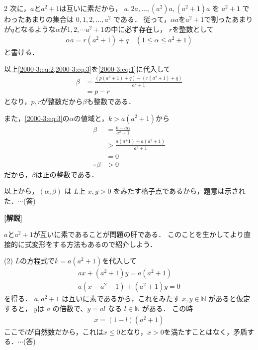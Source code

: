 \documentclass[../../../../main.tex]{subfiles}
\begin{document}
\begin{multicols}{2}
  次に，$a$と$a^2+1$は互いに素だから，
  $a, 2a, \dots, (a^2)a, (a^2+1)a$ を $a^2+1$ でわったあまりの集合は $0, 1, 2, \dots, a^2$ である．
  従って，$\alpha a$を$a^2+1$で割ったあまりが$q$となるような$\alpha$が$1,2,\cdots a^2+1$の中に必ず存在し，
  $r$を整数として
  \begin{align}
    \alpha a = r(a^2+1) + q \quad (1 \le \alpha \le a^2+1) \label{2000-3:eq:3}
  \end{align}
  と書ける．

  以上\cref{2000-3:eq:2,2000-3:eq:3}を\cref{2000-3:eq:1}に代入して
  \begin{align*}
    \beta
     & = \frac{(p(a^2+1) + q) - (r(a^2+1)+q)}{a^2+1} \\
     & = p - r
  \end{align*}
  となり，$p,r$が整数だから$\beta$も整数である．

  また，\cref{2000-3:eq:3}の$\alpha$の値域と，$k>a(a^2+1)$から
  \begin{align*}
    \beta
          & = \frac{k-a\alpha}{a^2+1}        \\
          & > \frac{a(a^+1)-a(a^2+1)}{a^2+1} \\
          & = 0                              \\
    \therefore
    \beta & > 0
  \end{align*}
  だから，$\beta$は正の整数である．

  以上から，$(\alpha, \beta)$ は $L$上 $x, y > 0$ をみたす格子点であるから，題意は示された．$\cdots$(答)

  \vspace{10pt}
  {\bf[解説]}

  $a$と$a^2+1$が互いに素であることが問題の肝である．
  このことを生かしてより直接的に式変形をする方法もあるので紹介しよう．

  (2)
  $L$の方程式で$k=a(a^2+1)$を代入して
  \begin{align*}
    ax + (a^2+1)y = a(a^2+1) \\
    a\left( x - a^2 - 1 \right) + (a^2+1)y = 0
  \end{align*}
  を得る．
  $a, a^2+1$ は互いに素であるから，これをみたす $x, y \in \mathbb{N}$ があると仮定すると，
  $y$は $a$ の倍数で、$y=al$ なる $l \in \mathbb{N}$ がある．
  この時
  \begin{align*}
    x = (1-l)(a^2+1)
  \end{align*}
  ここで$l$が自然数だから，これは$x\le 0$となり，$x>0$を満たすことはなく，矛盾する．$\cdots$(答)


\end{multicols}
\end{document}
